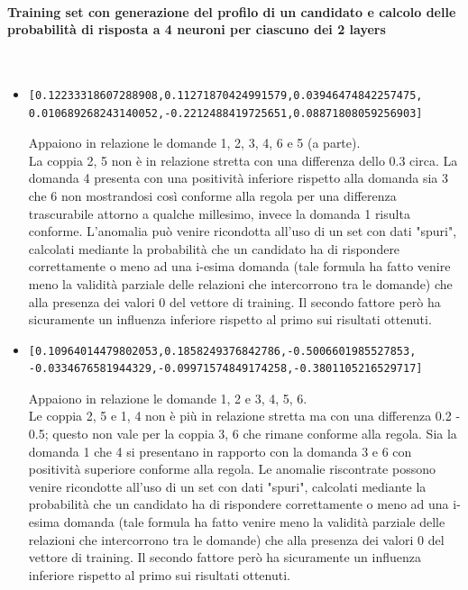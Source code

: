 \paragraph{Training set con generazione del profilo di un candidato e calcolo delle probabilit\`a di risposta a 4 neuroni per ciascuno dei 2 layers}\mbox{}
\label{Training set con generazione del profilo di un candidato e calcolo delle probabilita di risposta a 4 neuroni per ciascuno dei 2 layers}
\\
\noindent
\begin{itemize}
\item  \begin{verbatim}[0.12233318607288908,0.11271870424991579,0.03946474842257475,
0.010689268243140052,-0.2212488419725651,0.08871808059256903]
\end{verbatim}
Appaiono in relazione le domande 1, 2, 3, 4, 6 e 5 (a parte).\\
La coppia 2, 5 non \`e in relazione stretta con una differenza dello 0.3 circa. La domanda 4 presenta con una positivit\`a inferiore rispetto alla domanda sia 3 che 6 non mostrandosi cos\`i conforme alla regola per una differenza trascurabile attorno a qualche millesimo, invece la domanda 1 risulta conforme. L'anomalia pu\`o venire ricondotta all'uso di un set con dati "spuri", calcolati mediante la probabilit\`a che un candidato ha di rispondere correttamente o meno ad una i-esima domanda (tale formula ha fatto venire meno la validit\`a parziale delle relazioni che intercorrono tra le domande) che alla presenza dei valori 0 del vettore di training. Il secondo fattore per\`o ha sicuramente un influenza inferiore rispetto al primo sui risultati ottenuti.

\item \begin{verbatim}[0.10964014479802053,0.1858249376842786,-0.5006601985527853,
-0.0334676581944329,-0.09971574849174258,-0.3801105216529717]

\end{verbatim}
Appaiono in relazione le domande 1, 2  e 3, 4, 5, 6.\\
Le coppia 2, 5 e  1, 4 non \`e pi\`u in relazione stretta ma con una differenza 0.2 - 0.5; questo non vale per la coppia 3, 6 che rimane conforme alla regola. Sia la domanda 1 che 4 si presentano in rapporto con la domanda 3 e 6 con positivit\`a superiore conforme alla regola. 
Le anomalie riscontrate possono venire ricondotte all'uso di un set con dati "spuri", calcolati mediante la probabilit\`a che un candidato ha di rispondere correttamente o meno ad una i-esima domanda (tale formula ha fatto venire meno la validit\`a parziale delle relazioni che intercorrono tra le domande) che alla presenza dei valori 0 del vettore di training. Il secondo fattore per\`o ha sicuramente un influenza inferiore rispetto al primo sui risultati ottenuti.


\end{itemize}
